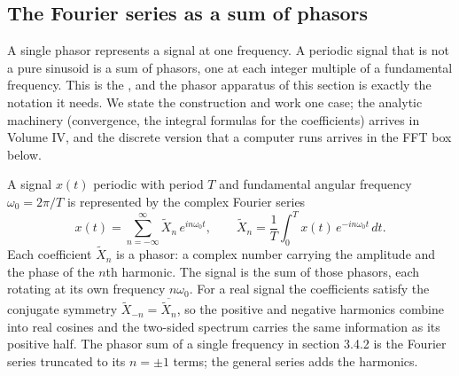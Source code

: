 \subsection{The Fourier series as a sum of phasors}

A single phasor represents a signal at one frequency. A periodic
signal that is not a pure sinusoid is a sum of phasors, one at each
integer multiple of a fundamental frequency. This is the
, and the phasor apparatus of this section is
exactly the notation it needs. We state the construction and work one
case; the analytic machinery (convergence, the integral formulas for
the coefficients) arrives in Volume IV, and the discrete version that
a computer runs arrives in the FFT box below.

A signal $x(t)$ periodic with period $T$ and fundamental angular
frequency $\omega_{0} = 2\pi/T$ is represented by the complex Fourier
series
\[
x(t) = \sum_{n = -\infty}^{\infty} \tilde X_{n}\, e^{i n \omega_{0} t},
\qquad
\tilde X_{n} = \frac{1}{T} \int_{0}^{T} x(t)\, e^{-i n \omega_{0} t}\, dt.
\]
Each coefficient $\tilde X_{n}$ is a phasor: a complex number carrying
the amplitude and the phase of the $n$th harmonic. The signal is the
sum of those phasors, each rotating at its own frequency
$n\omega_{0}$. For a real signal the coefficients satisfy the
conjugate symmetry $\tilde X_{-n} = \overline{\tilde X_{n}}$, so the
positive and negative harmonics combine into real cosines and the
two-sided spectrum carries the same information as its positive half.
The phasor sum of a single frequency in section 3.4.2 is the Fourier
series truncated to its $n = \pm 1$ terms; the general series adds the
harmonics.

